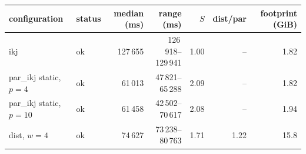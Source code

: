 \begin{tabular}{llrrrrr}
\toprule
configuration & status & median (ms) & range (ms) & $S$ & dist/par & footprint (GiB) \\
\midrule
ikj & ok & 127\,655 & 126\,918--129\,941 & 1.00 & -- & 1.82 \\
par\_ikj static, $p=4$ & ok & 61\,013 & 47\,821--65\,288 & 2.09 & -- & 1.82 \\
par\_ikj static, $p=10$ & ok & 61\,458 & 42\,502--70\,617 & 2.08 & -- & 1.94 \\
dist, $w=4$ & ok & 74\,627 & 73\,238--80\,763 & 1.71 & 1.22 & 15.8 \\
\bottomrule
\end{tabular}
\par{}
